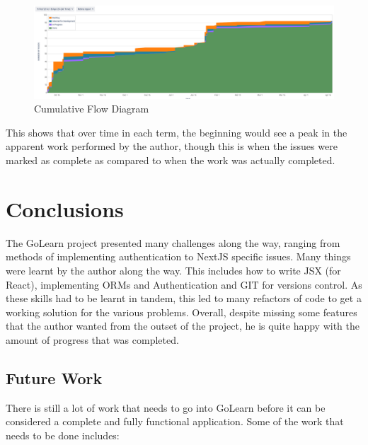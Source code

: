 \documentclass[11pt, a4paper,twoside]{report}
\theoremstyle{plain} %
\theoremstyle{definition} %
\numberwithin{equation}{chapter}
\begin{document}
\begin{figure}[ht]
    \centering
    \includegraphics[width=\textwidth]{cummulative_flow_diagram.png}
    \caption{Cumulative Flow Diagram}\label{fig:cumm-flow-diag}
\end{figure}

This shows that over time in each term, the beginning would see a peak in the
apparent work performed by the author, though this is when the issues were
marked as complete as compared to when the work was actually completed.

\chapter{Conclusions}\label{ch:conclusion}

The GoLearn project presented many challenges along the way, ranging from
methods of implementing authentication to NextJS specific issues. Many things
were learnt by the author along the way. This includes how to write JSX (for
React), implementing ORMs and Authentication and GIT for versions control. As
these skills had to be learnt in tandem, this led to many refactors of code to
get a working solution for the various problems. Overall, despite missing some
features that the author wanted from the outset of the project, he is quite
happy with the amount of progress that was completed.

\section{Future Work}

There is still a lot of work that needs to go into GoLearn before it can be
considered a complete and fully functional application. Some of the work that
needs to be done includes:
\end{document}
